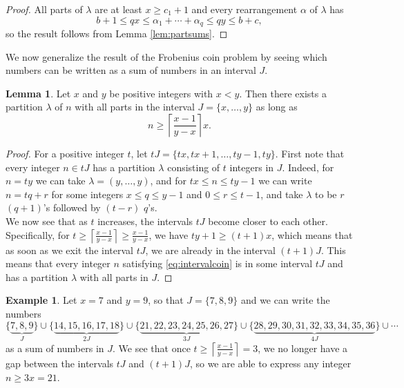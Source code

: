 \documentclass[12pt]{amsart}  %
\theoremstyle{definition}
\newtheorem{lemma}[theorem]{Lemma}
\newtheorem{example}[theorem]{Example}
\theoremstyle{remark}
\numberwithin{equation}{section}
\begin{document}
\begin{proof}
All parts of $\lambda$ are at least $x\geq c_1+1$ and every rearrangement $\alpha$ of $\lambda$ has
\begin{equation*}
b+1\leq qx\leq\alpha_1+\cdots+\alpha_q\leq qy\leq b+c,
\end{equation*}
so the result follows from Lemma \ref{lem:partsums}.
\end{proof}

We now generalize the result of the Frobenius coin problem by seeing which numbers can be written as a sum of numbers in an interval $J$.

\begin{lemma}\label{lem:frobint}
Let $x$ and $y$ be positive integers with $x<y$. Then there exists a partition $\lambda$ of $n$ with all parts in the interval $J=\{x,\ldots,y\}$ as long as 
\begin{equation}\label{eq:intervalcoin}
n\geq\left\lceil\frac{x-1}{y-x}\right\rceil x.
\end{equation}
\end{lemma}

\begin{proof}
For a positive integer $t$, let $tJ=\{tx,tx+1,\ldots,ty-1,ty\}$. First note that every integer $n\in tJ$ has a partition $\lambda$ consisting of $t$ integers in $J$. Indeed, for $n=ty$ we can take $\lambda=(y,\ldots,y)$, and for $tx\leq n\leq ty-1$ we can write $n=tq+r$ for some integers $x\leq q\leq y-1$ and $0\leq r\leq t-1$, and take $\lambda$ to be $r$ $(q+1)$'s followed by $(t-r)$ $q$'s.\\

We now see that as $t$ increases, the intervals $tJ$ become closer to each other. Specifically, for $t\geq\left\lceil\frac{x-1}{y-x}\right\rceil\geq\frac{x-1}{y-x}$, we have $ty+1\geq (t+1)x$, which means that as soon as we exit the interval $tJ$, we are already in the interval $(t+1)J$. This means that every integer $n$ satisfying \eqref{eq:intervalcoin} is in some interval $tJ$ and has a partition $\lambda$ with all parts in $J$.
\end{proof}


\begin{example}
Let $x=7$ and $y=9$, so that $J=\{7,8,9\}$ and we can write the numbers
\begin{equation*}
\{\underbrace{7,8,9}_J\}\cup\{\underbrace{14,15,16,17,18}_{2J}\}\cup\{\underbrace{21,22,23,24,25,26,27}_{3J}\}\cup\{\underbrace{28,29,30,31,32,33,34,35,36}_{4J}\}\cup\cdots
\end{equation*}
as a sum of numbers in $J$. We see that once $t\geq\left\lceil\frac{x-1}{y-x}\right\rceil=3$, we no longer have a gap between the intervals $tJ$ and $(t+1)J$, so we are able to express any integer $n\geq 3x=21$.
\end{example}
\end{document}
